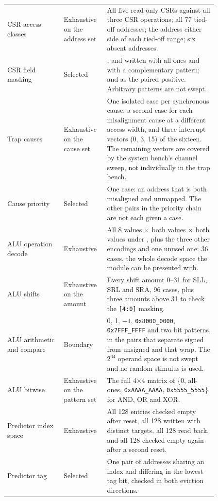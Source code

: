 {\begin{longtable}{@{}L{0.24\linewidth}L{0.15\linewidth}L{0.47\linewidth}@{}}
\midrule
CSR access classes & Exhaustive on the address set &
  All five read-only CSRs against all three CSR operations; all 77 tied-off
  addresses; the address either side of each tied-off range; six absent
  addresses. \\
CSR field masking & Selected &
  ,  and  written with all-ones and with a
  complementary pattern;  and  as the paired positive.
  Arbitrary patterns are not swept. \\
\midrule
Trap causes & Exhaustive on the cause set &
  One isolated case per synchronous cause, a second case for each misalignment
  cause at a different access width, and three interrupt vectors (0, 3, 15) of
  the sixteen. The remaining vectors are covered by the system bench's channel
  sweep, not individually in the trap bench. \\
Cause priority & Selected &
  One case: an address that is both misaligned and unmapped. The other pairs in
  the priority chain are not each given a case. \\
\midrule
ALU operation decode & Exhaustive &
  All 8  values $\times$ both  values $\times$ both
   values under , plus the three other
   encodings and one unused one: 36 cases, the whole decode space
  the module can be presented with. \\
ALU shifts & Exhaustive on the amount &
  Every shift amount 0--31 for SLL, SRL and SRA, 96 cases, plus three amounts
  above 31 to check the \texttt{[4:0]} masking. \\
ALU arithmetic and compare & Boundary &
  0, 1, $-1$, \texttt{0x8000\_0000}, \texttt{0x7FFF\_FFFF} and two bit
  patterns, in the pairs that separate signed from unsigned and that wrap. The
  $2^{64}$ operand space is not swept and no random stimulus is used. \\
ALU bitwise & Exhaustive on the pattern set &
  The full 4$\times$4 matrix of \{0, all-ones, \texttt{0xAAAA\_AAAA},
  \texttt{0x5555\_5555}\} for AND, OR and XOR. \\
\midrule
Predictor index space & Exhaustive &
  All 128 entries checked empty after reset, all 128 written with distinct
  targets, all 128 read back, and all 128 checked empty again after a second
  reset. \\
Predictor tag & Selected &
  One pair of addresses sharing an index and differing in the lowest tag bit,
  checked in both eviction directions. \\

\end{longtable}}
